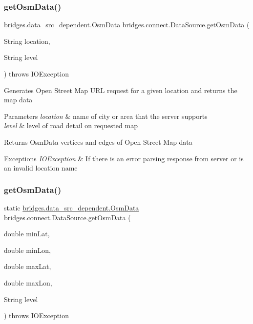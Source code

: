 \subsubsection{\texorpdfstring{get\+Osm\+Data()}{getOsmData()}\hspace{0.1cm}{\footnotesize\ttfamily [2/3]}}
{\footnotesize\ttfamily \hyperlink{classbridges_1_1data__src__dependent_1_1_osm_data}{bridges.\+data\+\_\+src\+\_\+dependent.\+Osm\+Data} bridges.\+connect.\+Data\+Source.\+get\+Osm\+Data (\begin{DoxyParamCaption}\item[{String}]{location,  }\item[{String}]{level }\end{DoxyParamCaption}) throws I\+O\+Exception}

Generates Open Street Map U\+RL request for a given location and returns the map data 
\begin{DoxyParams}{Parameters}
{\em location} & name of city or area that the server supports \\
\hline
{\em level} & level of road detail on requested map \\
\hline
\end{DoxyParams}
\begin{DoxyReturn}{Returns}
Osm\+Data vertices and edges of Open Street Map data 
\end{DoxyReturn}

\begin{DoxyExceptions}{Exceptions}
{\em I\+O\+Exception} & If there is an error parsing response from server or is an invalid location name \\
\hline
\end{DoxyExceptions}
\mbox{\label{classbridges_1_1connect_1_1_data_source_a02158c0c41908db27fc4200bd9c096f4}} 
\subsubsection{\texorpdfstring{get\+Osm\+Data()}{getOsmData()}\hspace{0.1cm}{\footnotesize\ttfamily [3/3]}}
{\footnotesize\ttfamily static \hyperlink{classbridges_1_1data__src__dependent_1_1_osm_data}{bridges.\+data\+\_\+src\+\_\+dependent.\+Osm\+Data} bridges.\+connect.\+Data\+Source.\+get\+Osm\+Data (\begin{DoxyParamCaption}\item[{double}]{min\+Lat,  }\item[{double}]{min\+Lon,  }\item[{double}]{max\+Lat,  }\item[{double}]{max\+Lon,  }\item[{String}]{level }\end{DoxyParamCaption}) throws I\+O\+Exception\hspace{0.3cm}{\ttfamily [static]}}

